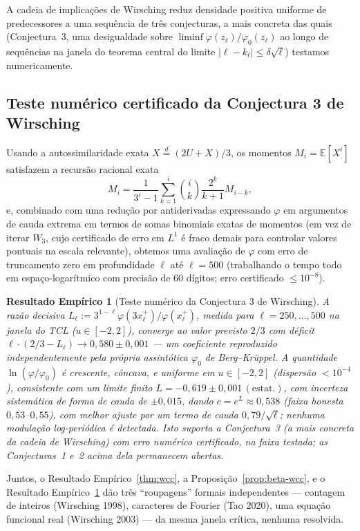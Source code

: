 \documentclass[11pt]{article}
\newtheorem{empirical}[theorem]{Resultado Empírico}
\theoremstyle{definition}
\theoremstyle{remark}
\begin{document}
A cadeia de implicações de Wirsching reduz densidade positiva uniforme
de predecessores a uma sequência de três conjecturas, a mais concreta
das quais (Conjectura~3, uma desigualdade sobre
$\liminf \varphi(z_\ell)/\varphi_0(z_\ell)$ ao longo de sequências na
janela do teorema central do limite $|\ell-k_\ell|\le \delta\sqrt\ell$)
testamos numericamente.

\subsection{Teste numérico certificado da Conjectura 3 de Wirsching}

Usando a autossimilaridade exata $X\overset{d}{=}(2U+X)/3$, os momentos
$M_i=\mathbb{E}[X^i]$ satisfazem a recursão racional exata
\[
  M_i = \frac{1}{3^i-1}\sum_{k=1}^i \binom{i}{k}\frac{2^k}{k+1} M_{i-k},
\]
e, combinado com uma redução por antiderivadas expressando $\varphi$
em argumentos de cauda extrema em termos de somas binomiais exatas de
momentos (em vez de iterar $W_3$, cujo certificado de erro em $L^1$ é
fraco demais para controlar valores pontuais na escala relevante),
obtemos uma avaliação de $\varphi$ com erro de truncamento zero em
profundidade $\ell$ até $\ell=500$ (trabalhando o tempo todo em
espaço-logarítmico com precisão de $60$ dígitos; erro certificado
$\le 10^{-8}$).

\begin{empirical}[Teste numérico da Conjectura 3 de Wirsching]
\label{thm:conjecture3}
A razão decisiva $L_\ell := 3^{1-\ell}\varphi(3x_\ell^+)/\varphi(x_\ell^+)$,
medida para $\ell=250,\dots,500$ na janela do TCL ($u\in[-2,2]$),
converge ao valor previsto $2/3$ com déficit
$\ell\cdot(2/3-L_\ell) \to 0{,}580\pm 0{,}001$ --- um coeficiente
reproduzido independentemente pela própria assintótica $\varphi_0$ de
Berg--Krüppel. A quantidade $\ln(\varphi/\varphi_0)$ é crescente,
côncava, e uniforme em $u\in[-2,2]$ (dispersão $<10^{-4}$),
consistente com um limite finito
$L=-0{,}619\pm0{,}001\,(\text{estat.})$, com incerteza sistemática de
forma de cauda de $\pm 0{,}015$, dando $c=e^L\approx 0{,}538$ (faixa
honesta $0{,}53$--$0{,}55$), com melhor ajuste por um termo de cauda
$0{,}79/\sqrt\ell$; nenhuma modulação log-periódica é detectada. Isto
suporta a Conjectura~3 (a mais concreta da cadeia de Wirsching) com
erro numérico certificado, na faixa testada; as Conjecturas~1 e~2
acima dela permanecem abertas.
\end{empirical}

Juntos, o Resultado Empírico~\ref{thm:wcc}, a
Proposição~\ref{prop:beta-wcc}, e o Resultado Empírico~\ref{thm:conjecture3}
dão três ``roupagens'' formais
independentes --- contagem de inteiros (Wirsching 1998), caracteres de
Fourier (Tao 2020), uma equação funcional real (Wirsching 2003) --- da
mesma janela crítica, nenhuma resolvida.
\end{document}
